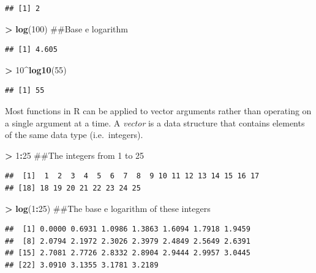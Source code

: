 \documentclass[]{krantz}
\makeatletter
\newenvironment{Shaded}{\begin{snugshade}}{\end{snugshade}}
\newcommand{\KeywordTok}[1]{\textcolor[rgb]{0.27,0.27,0.27}{\textbf{#1}}}
\newcommand{\DecValTok}[1]{\textcolor[rgb]{0.06,0.06,0.06}{#1}}
\newcommand{\StringTok}[1]{\textcolor[rgb]{0.5,0.5,0.5}{#1}}
\newcommand{\OperatorTok}[1]{\textcolor[rgb]{0.43,0.43,0.43}{\textbf{#1}}}
\newcommand{\NormalTok}[1]{#1}
\newenvironment{kframe}{%
\medskip{}
\setlength{\fboxsep}{.8em}
 \def\at@end@of@kframe{}%
 \ifinner\ifhmode%
  \def\at@end@of@kframe{\end{minipage}}%
  \begin{minipage}{\columnwidth}%
 \fi\fi%
 \def\FrameCommand##1{\hskip\@totalleftmargin \hskip-\fboxsep
 \colorbox{shadecolor}{##1}\hskip-\fboxsep
     \hskip-\linewidth \hskip-\@totalleftmargin \hskip\columnwidth}%
 \MakeFramed {\advance\hsize-\width
   \@totalleftmargin\z@ \linewidth\hsize
   \@setminipage}}%
 {\par\unskip\endMakeFramed%
 \at@end@of@kframe}
\renewenvironment{Shaded}{\begin{kframe}}{\end{kframe}}
\theoremstyle{definition}
\theoremstyle{definition}
\theoremstyle{definition}
\theoremstyle{remark}
\makeatother
\begin{document}
\begin{verbatim}
## [1] 2
\end{verbatim}

\begin{Shaded}
\begin{Highlighting}[]
\OperatorTok{>}\StringTok{ }\KeywordTok{log}\NormalTok{(}\DecValTok{100}\NormalTok{)  ##Base e logarithm}
\end{Highlighting}
\end{Shaded}

\begin{verbatim}
## [1] 4.605
\end{verbatim}

\begin{Shaded}
\begin{Highlighting}[]
\OperatorTok{>}\StringTok{ }\DecValTok{10}\OperatorTok{^}\KeywordTok{log10}\NormalTok{(}\DecValTok{55}\NormalTok{)}
\end{Highlighting}
\end{Shaded}

\begin{verbatim}
## [1] 55
\end{verbatim}

Most functions in R can be applied to vector arguments rather than
operating on a single argument at a time. A \emph{vector} is a data
structure that contains elements of the same data type (i.e.~integers).

\begin{Shaded}
\begin{Highlighting}[]
\OperatorTok{>}\StringTok{ }\DecValTok{1}\OperatorTok{:}\DecValTok{25}\NormalTok{ ##The integers from 1 to 25}
\end{Highlighting}
\end{Shaded}

\begin{verbatim}
##  [1]  1  2  3  4  5  6  7  8  9 10 11 12 13 14 15 16 17
## [18] 18 19 20 21 22 23 24 25
\end{verbatim}

\begin{Shaded}
\begin{Highlighting}[]
\OperatorTok{>}\StringTok{ }\KeywordTok{log}\NormalTok{(}\DecValTok{1}\OperatorTok{:}\DecValTok{25}\NormalTok{) ##The base e logarithm of these integers}
\end{Highlighting}
\end{Shaded}

\begin{verbatim}
##  [1] 0.0000 0.6931 1.0986 1.3863 1.6094 1.7918 1.9459
##  [8] 2.0794 2.1972 2.3026 2.3979 2.4849 2.5649 2.6391
## [15] 2.7081 2.7726 2.8332 2.8904 2.9444 2.9957 3.0445
## [22] 3.0910 3.1355 3.1781 3.2189
\end{verbatim}
\end{document}
